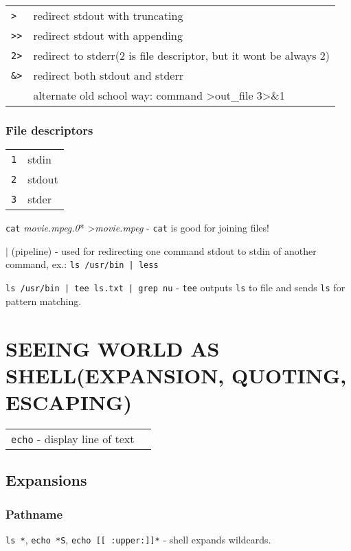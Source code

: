 \documentclass[8pt]{extarticle}
\begin{document}
\begin{multicols}{2}
\begin{tabular}{ll}
	\texttt{>} & redirect stdout with truncating\\
	\texttt{>>} & redirect stdout with appending\\
	\texttt{2>} & redirect to stderr(2 is file descriptor, but it wont be always 2)\\
	\texttt{\&>} & redirect both stdout and stderr\\
	& alternate old school way: command \textgreater out\_file 3\textgreater\&1
\end{tabular}

\subsubsection{File descriptors}
\begin{tabular}{ll}
	\texttt{1} & stdin\\
	\texttt{2} & stdout\\
	\texttt{3} & stder\\
\end{tabular}

\texttt{cat} \textit{movie.mpeg.0}* \textgreater  \textit{movie.mpeg} - \texttt{cat} is good for joining files!

$|$ (pipeline) - used for redirecting one command stdout to stdin of another command, ex.: \texttt{ls /usr/bin | less}

\texttt{ls /usr/bin | tee ls.txt | grep nu} - \texttt{tee} outputs \texttt{ls} to file and sends \texttt{ls} for pattern matching.

\section{SEEING WORLD AS SHELL(EXPANSION, QUOTING, ESCAPING)}

\begin{tabular}{ll}
	\texttt{echo} - display line of text
\end{tabular}

\subsection{Expansions}

\subsubsection{Pathname}

\texttt{ls *}, \texttt{echo *S}, \texttt{echo [[ :upper:]]*} - shell expands wildcards.


\end{multicols}
\end{document}
